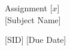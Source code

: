 \documentclass[a4paper, 11pt]{article}
\newcommand{\hln}{\vspace{-6mm}\begin{flushleft}\mbox{}\hrulefill\mbox{}\end{flushleft}\vspace{-6mm}}
\newcommand{\hsurround}[1]{\hln #1 \vspace{-6pt} \hln}
\theoremstyle{plain}
\theoremstyle{definition}
\begin{document}
\pagestyle{fancy}
\begin{center}
Assignment [$x$]\\

[Subject Name]

\hsurround{[SID] \hfill [Due Date]}
\end{center}
\end{document}
